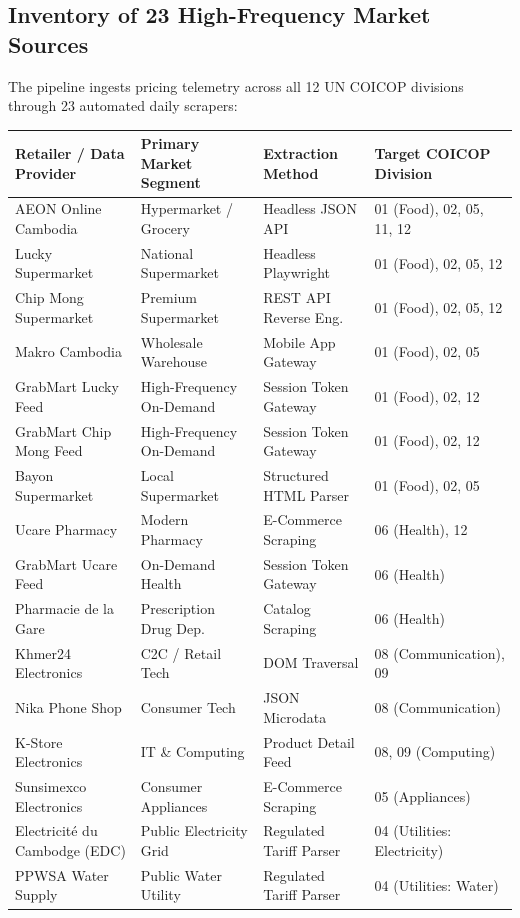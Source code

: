 \documentclass[11pt,a4paper]{article}
\begin{document}
\subsection{Inventory of 23 High-Frequency Market Sources}
The pipeline ingests pricing telemetry across all 12 UN COICOP divisions through 23 automated daily scrapers:

\begin{longtable}{p{4.2cm}p{3.2cm}p{3.0cm}p{3.8cm}}
\toprule
\textbf{Retailer / Data Provider} & \textbf{Primary Market Segment} & \textbf{Extraction Method} & \textbf{Target COICOP Division} \\
\midrule
\endhead
AEON Online Cambodia & Hypermarket / Grocery & Headless JSON API & 01 (Food), 02, 05, 11, 12 \\
Lucky Supermarket & National Supermarket & Headless Playwright & 01 (Food), 02, 05, 12 \\
Chip Mong Supermarket & Premium Supermarket & REST API Reverse Eng. & 01 (Food), 02, 05, 12 \\
Makro Cambodia & Wholesale Warehouse & Mobile App Gateway & 01 (Food), 02, 05 \\
GrabMart Lucky Feed & High-Frequency On-Demand & Session Token Gateway & 01 (Food), 02, 12 \\
GrabMart Chip Mong Feed & High-Frequency On-Demand & Session Token Gateway & 01 (Food), 02, 12 \\
Bayon Supermarket & Local Supermarket & Structured HTML Parser & 01 (Food), 02, 05 \\
Ucare Pharmacy & Modern Pharmacy & E-Commerce Scraping & 06 (Health), 12 \\
GrabMart Ucare Feed & On-Demand Health & Session Token Gateway & 06 (Health) \\
Pharmacie de la Gare & Prescription Drug Dep. & Catalog Scraping & 06 (Health) \\
Khmer24 Electronics & C2C / Retail Tech & DOM Traversal & 08 (Communication), 09 \\
Nika Phone Shop & Consumer Tech & JSON Microdata & 08 (Communication) \\
K-Store Electronics & IT \& Computing & Product Detail Feed & 08, 09 (Computing) \\
Sunsimexco Electronics & Consumer Appliances & E-Commerce Scraping & 05 (Appliances) \\
Electricité du Cambodge (EDC) & Public Electricity Grid & Regulated Tariff Parser & 04 (Utilities: Electricity) \\
PPWSA Water Supply & Public Water Utility & Regulated Tariff Parser & 04 (Utilities: Water) \\

\end{longtable}
\end{document}
